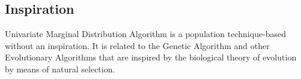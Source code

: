 \subsection{Inspiration}
Univariate Marginal Distribution Algorithm is a population technique-based without an inspiration. It is related to the Genetic Algorithm and other Evolutionary Algorithms that are inspired by the biological theory of evolution by means of natural selection.


